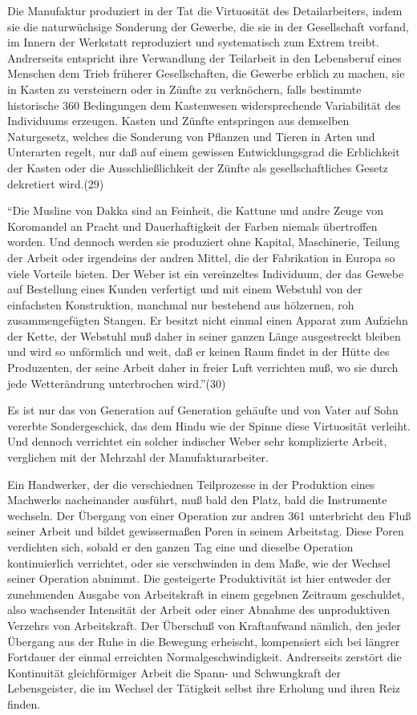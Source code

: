 {Die Manufaktur produziert in der Tat die Virtuosität des
Detailarbeiters, indem sie die naturwüchsige Sonderung der Gewerbe, die
sie in der Gesellschaft vorfand, im Innern der Werkstatt reproduziert
und systematisch zum Extrem treibt. Andrerseits entspricht ihre
Verwandlung der Teilarbeit in den Lebensberuf eines Menschen dem Trieb
früherer Gesellschaften, die Gewerbe erblich zu machen, sie in Kasten zu
versteinern oder in Zünfte zu verknöchern, falls bestimmte historische
\num{360} Bedingungen dem Kastenwesen widersprechende
Variabilität des Individuums erzeugen. Kasten und Zünfte entspringen aus
demselben Naturgesetz, welches die Sonderung von Pflanzen und Tieren in
Arten und Unterarten regelt, nur daß auf einem gewissen Entwicklungsgrad
die Erblichkeit der Kasten oder die Ausschließlichkeit der Zünfte als
gesellschaftliches Gesetz dekretiert wird.(29)

``Die Musline von Dakka sind an Feinheit, die Kattune und andre Zeuge
von Koromandel an Pracht und Dauerhaftigkeit der Farben niemals
übertroffen worden. Und dennoch werden sie produziert ohne Kapital,
Maschinerie, Teilung der Arbeit oder irgendeins der andren Mittel, die
der Fabrikation in Europa so viele Vorteile bieten. Der Weber ist ein
vereinzeltes Individuum, der das Gewebe auf Bestellung eines Kunden
verfertigt und mit einem Webstuhl von der einfachsten Konstruktion,
manchmal nur bestehend aus hölzernen, roh zusammengefügten Stangen. Er
besitzt nicht einmal einen Apparat zum Aufziehn der Kette, der Webstuhl
muß daher in seiner ganzen Länge ausgestreckt bleiben und wird so
unförmlich und weit, daß er keinen Raum findet in der Hütte des
Produzenten, der seine Arbeit daher in freier Luft verrichten muß, wo
sie durch jede Wetterändrung unterbrochen wird.''(30)

Es ist nur das von Generation auf Generation gehäufte und von Vater auf
Sohn vererbte Sondergeschick, das dem Hindu wie der Spinne diese
Virtuosität verleiht. Und dennoch verrichtet ein solcher indischer Weber
sehr komplizierte Arbeit, verglichen mit der Mehrzahl der
Manufakturarbeiter.

Ein Handwerker, der die verschiednen Teilprozesse in der Produktion
eines Machwerks nacheinander ausführt, muß bald den Platz, bald die
Instrumente wechseln. Der Übergang von einer Operation zur andren
\num{361} unterbricht den Fluß seiner Arbeit und
bildet gewissermaßen Poren in seinem Arbeitstag. Diese Poren verdichten
sich, sobald er den ganzen Tag eine und dieselbe Operation
kontinuierlich verrichtet, oder sie verschwinden in dem Maße, wie der
Wechsel seiner Operation abnimmt. Die gesteigerte Produktivität ist hier
entweder der zunehmenden Ausgabe von Arbeitskraft in einem gegebnen
Zeitraum geschuldet, also wachsender Intensität der Arbeit oder einer
Abnahme des unproduktiven Verzehrs von Arbeitskraft. Der Überschuß von
Kraftaufwand nämlich, den jeder Übergang aus der Ruhe in die Bewegung
erheischt, kompensiert sich bei längrer Fortdauer der einmal erreichten
Normalgeschwindigkeit. Andrerseits zerstört die Kontinuität
gleichförmiger Arbeit die Spann- und Schwungkraft der Lebensgeister, die
im Wechsel der Tätigkeit selbst ihre Erholung und ihren Reiz finden.

}
